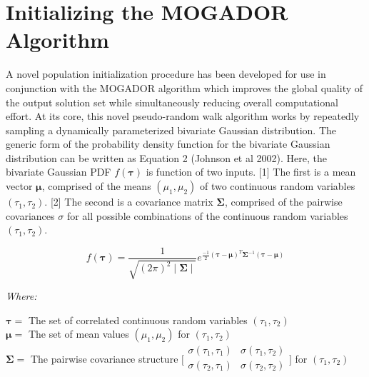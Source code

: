 \section{Initializing the MOGADOR Algorithm}
    
A novel population initialization procedure has been developed for use in conjunction with the MOGADOR algorithm which improves the global quality of the output solution set while simultaneously reducing overall computational effort. At its core, this novel pseudo-random walk algorithm works by repeatedly sampling a dynamically parameterized bivariate Gaussian distribution. The generic form of the probability density function for the bivariate Gaussian distribution can be written as Equation 2 (Johnson et al 2002). Here, the bivariate Gaussian PDF $f(\boldsymbol{\tau})$ is function of two inputs. [1] The first is a mean vector $\boldsymbol{\mu}$, comprised of the means $(\mu_1, \mu_2)$ of two continuous random variables $(\tau_1, \tau_2)$. [2] The second is a covariance matrix $\boldsymbol{\Sigma}$, comprised of the pairwise covariances $\sigma$ for all possible combinations of the continuous random variables $(\tau_1, \tau_2)$.
            
            \begin{equation}
            f(\boldsymbol{\tau}) = \frac{1}{ \sqrt{ (2\pi)^2 \mid \boldsymbol{\Sigma} \mid} } e^{ \frac{-1}{2} ( \boldsymbol{\tau} - \boldsymbol{\mu} )^T \boldsymbol{ \Sigma}^{-1} ( \boldsymbol{\tau} - \boldsymbol{\mu} ) }
            \end{equation}

            \noindent \textit{Where:} \hfill

            \begin{center}
            $\boldsymbol{\tau} =$ The set of correlated continuous random variables $(\tau_1, \tau_2)$
            \\
            $\boldsymbol{\mu} = $ The set of mean values $(\mu_1, \mu_2)$ for $(\tau_1, \tau_2)$
            \\
            $\boldsymbol{\Sigma} =$ The pairwise covariance structure $\bigl[\begin{smallmatrix} \sigma(\tau_{1},\tau_{1}) & \sigma(\tau_{1},\tau_{2}) \\ \sigma(\tau_{2},\tau_{1}) & \sigma(\tau_{2},\tau_{2}) \\ \end{smallmatrix}\bigr]$ for $(\tau_{1}, \tau_{2})$
            \end{center}
            
